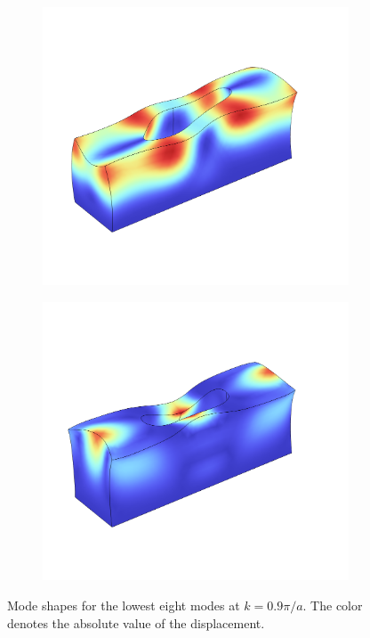 \begin{figure}[htpb]
\begin{subfigure}[]{0.24\textwidth}
\begin{center}
		\end{center}
		\subcaption{}%
		\label{fig:ms6}
	\end{subfigure}
	\begin{subfigure}[]{0.24\textwidth}
		\begin{center}
			\includegraphics[width=\textwidth]{chapters/theory/modeshape_7.png}
		\end{center}
		\subcaption{}%
		\label{fig:ms7}
	\end{subfigure}
	\begin{subfigure}[]{0.24\textwidth}
		\begin{center}
			\includegraphics[width=\textwidth]{chapters/theory/modeshape_8.png}
		\end{center}
		\subcaption{}%
		\label{fig:ms8}
	\end{subfigure}

	\caption{%
		Mode shapes for the lowest eight modes at $k=0.9 \pi / a$.
		The color denotes the absolute value of the displacement.
	}
	\label{fig:modeshapes}
\end{figure}
